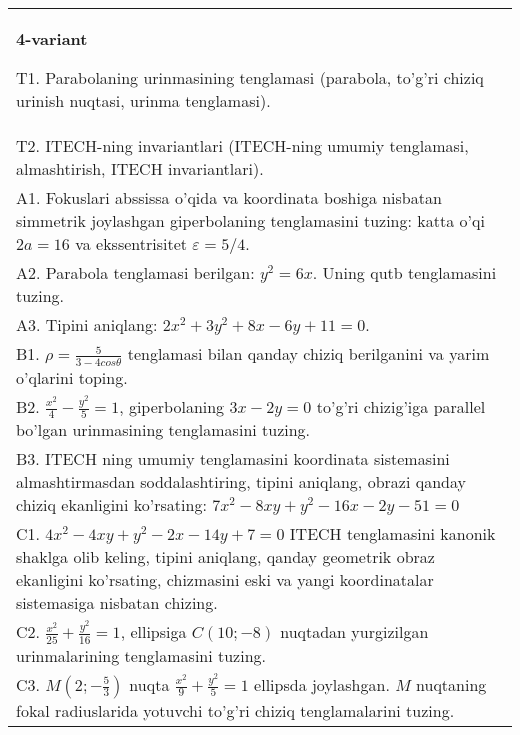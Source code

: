 \documentclass{article}
\begin{document}
\begin{tabular}{m{17cm}}
\textbf{4-variant}
\newline

T1. Parabolaning urinmasining tenglamasi (parabola, to'g'ri chiziq urinish nuqtasi, urinma tenglamasi).\\

T2. ITECH-ning invariantlari (ITECH-ning umumiy tenglamasi, almashtirish, ITECH invariantlari).\\

A1. Fokuslari abssissa o'qida va koordinata boshiga nisbatan simmetrik joylashgan giperbolaning tenglamasini tuzing: katta o'qi $2a=16$ va ekssentrisitet $\varepsilon=5/4$.\\

A2. Parabola tenglamasi berilgan: $y^2=6x$. Uning qutb tenglamasini tuzing.\\

A3. Tipini aniqlang: $2x^{2}+3y^{2}+8x-6y+11=0$.\\

B1. $\rho = \frac{5}{3 - 4cos\theta}$ tenglamasi bilan qanday chiziq berilganini va yarim o'qlarini toping.  \\

B2. $\frac{x^{2}}{4} - \frac{y^{2}}{5} = 1$, giperbolaning $3x - 2y = 0$ to'g'ri chizig'iga parallel bo'lgan urinmasining tenglamasini tuzing.  \\

B3. ITECH ning umumiy tenglamasini koordinata sistemasini almashtirmasdan soddalashtiring, tipini aniqlang, obrazi qanday chiziq ekanligini ko'rsating: $7x^{2} - 8xy + y^{2} - 16x - 2y - 51 = 0$\\

C1. $4x^{2} - 4xy + y^{2} - 2x - 14y + 7 = 0$ ITECH tenglamasini kanonik shaklga olib keling, tipini aniqlang, qanday geometrik obraz ekanligini ko'rsating, chizmasini eski va yangi koordinatalar sistemasiga nisbatan chizing.  \\

C2. $\frac{x^{2}}{25} + \frac{y^{2}}{16} = 1$, ellipsiga $C(10; - 8)$ nuqtadan yurgizilgan urinmalarining tenglamasini tuzing.  \\

C3. $M(2; - \frac{5}{3})$ nuqta $\frac{x^{2}}{9} + \frac{y^{2}}{5} = 1$ ellipsda joylashgan. $M$ nuqtaning fokal radiuslarida yotuvchi to'g'ri chiziq tenglamalarini tuzing.  \\

\end{tabular}
\vspace{1cm}
\end{document}
